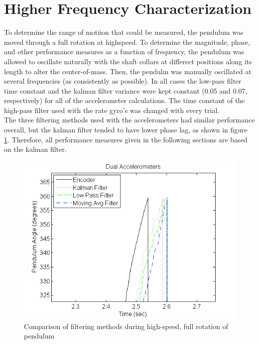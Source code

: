 \documentclass{article}
\theoremstyle{plain}
\theoremstyle{definition}
\theoremstyle{remark}
\begin{document}
\clearpage


\section{Higher Frequency Characterization}

To determine the range of motiion that could be measured, the pendulum was moved through a full rotation at highspeed. To determine the magnitude, phase, and other performance measures as a function of frequency, the pendulum was allowed to oscillate naturally with the shaft collars at differect positions along its length to alter the center-of-mass. Then, the pendulm was manually oscillated at several frequencies (as consistently as possible). In all cases the low-pass filter time constant and the kalman filter variance were kept constant (0.05 and 0.07, respectively) for all of the accelerometer calculations. The time constant of the high-pass filter used with the rate gyro's was changed with every trial.\\  

The three filtering methods used with the accelerometers had similar performance overall, but the kalman filter tended to have lower phase lag, as shown in figure \ref{kalman_lag}. Therefore, all performance measures given in the following sections are based on the kalman filter.\\

\begin{figure}[hbt]
\begin{center}
\includegraphics[width = 12cm]{Example_Kalman_Lag.png}
\caption{Comparison of filtering methods during high-speed, full rotation of pendulum}
\label{kalman_lag}
\end{center}
\end{figure}
\end{document}
